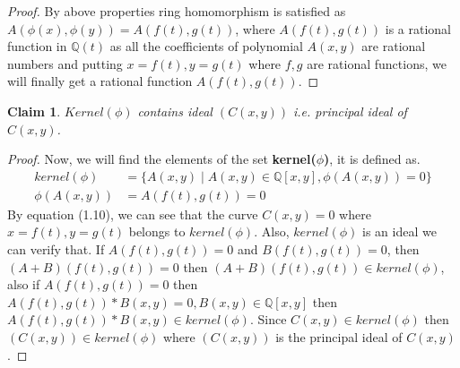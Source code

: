 \documentclass{article}
\let\bold\textbf
\newtheorem{claim}{Claim}[section]
\begin{document}
{\begin{proof}
    By above properties ring homomorphism is satisfied as $A(\phi(x),\phi(y))=A(f(t),g(t))$, where $A(f(t),g(t))$ is a rational function in $\mathbb{Q}(t)$ as all the coefficients of polynomial $A(x,y)$ are rational numbers and putting $x=f(t),y=g(t)$ where $f,g$ are rational functions, we will finally get a rational function $A(f(t),g(t))$.
  \end{proof}
    \begin{claim}
      $Kernel(\phi)$ contains ideal $(C(x,y))$ i.e. principal ideal of $C(x,y)$.
    \end{claim}
    \begin{proof}
    Now, we will find the elements of the set \bold{kernel($\phi$)}, it is defined as.
    \begin{align}
      kernel(\phi)&=\{A(x,y) \mid A(x,y) \in \mathbb{Q}[x,y], \phi(A(x,y))=0\} \label{eq:9} \\
      \phi(A(x,y))&=A(f(t),g(t))=0
    \end{align}
    By equation (1.10), we can see that the curve $C(x,y)=0$ where $x=f(t),y=g(t)$ belongs to $kernel(\phi)$. Also, $kernel(\phi)$ is an ideal we can verify that. \newline
    If $A(f(t),g(t))=0$ and $B(f(t),g(t))=0$, then $(A+B)(f(t),g(t))=0$ then $(A+B)(f(t),g(t)) \in kernel(\phi)$, also if $A(f(t),g(t))=0$ then $A(f(t),g(t))*B(x,y)=0,B(x,y) \in \mathbb{Q}[x,y]$ then $A(f(t),g(t))*B(x,y) \in kernel(\phi)$. \newline
    Since $C(x,y) \in kernel(\phi)$ then $(C(x,y)) \in kernel(\phi)$ where $(C(x,y))$ is the principal ideal of $C(x,y)$.
  \end{proof}
}
\newpage
\end{document}
